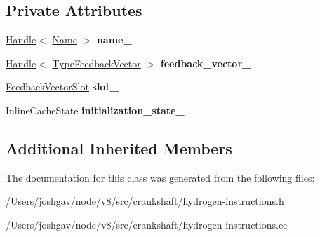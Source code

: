 \subsection*{Private Attributes}
\begin{DoxyCompactItemize}
\item 
\hyperlink{classv8_1_1internal_1_1_handle}{Handle}$<$ \hyperlink{classv8_1_1internal_1_1_name}{Name} $>$ {\bfseries name\+\_\+}\hypertarget{classv8_1_1internal_1_1_h_load_named_generic_ac1db7207cb93e5abeabba459d5b1514f}{}\label{classv8_1_1internal_1_1_h_load_named_generic_ac1db7207cb93e5abeabba459d5b1514f}

\item 
\hyperlink{classv8_1_1internal_1_1_handle}{Handle}$<$ \hyperlink{classv8_1_1internal_1_1_type_feedback_vector}{Type\+Feedback\+Vector} $>$ {\bfseries feedback\+\_\+vector\+\_\+}\hypertarget{classv8_1_1internal_1_1_h_load_named_generic_aec2c58af849486f0e7cf80a547a2a840}{}\label{classv8_1_1internal_1_1_h_load_named_generic_aec2c58af849486f0e7cf80a547a2a840}

\item 
\hyperlink{classv8_1_1internal_1_1_feedback_vector_slot}{Feedback\+Vector\+Slot} {\bfseries slot\+\_\+}\hypertarget{classv8_1_1internal_1_1_h_load_named_generic_a87362f63d6ed8d66fcc9082a32c71c69}{}\label{classv8_1_1internal_1_1_h_load_named_generic_a87362f63d6ed8d66fcc9082a32c71c69}

\item 
Inline\+Cache\+State {\bfseries initialization\+\_\+state\+\_\+}\hypertarget{classv8_1_1internal_1_1_h_load_named_generic_a2083105dbbddc596d00a3d614d7d022c}{}\label{classv8_1_1internal_1_1_h_load_named_generic_a2083105dbbddc596d00a3d614d7d022c}

\end{DoxyCompactItemize}
\subsection*{Additional Inherited Members}


The documentation for this class was generated from the following files\+:\begin{DoxyCompactItemize}
\item 
/\+Users/joshgav/node/v8/src/crankshaft/hydrogen-\/instructions.\+h\item 
/\+Users/joshgav/node/v8/src/crankshaft/hydrogen-\/instructions.\+cc\end{DoxyCompactItemize}
